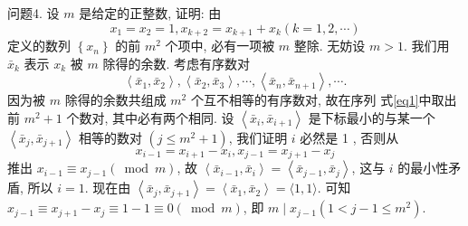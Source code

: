 问题4. 设 $m$ 是给定的正整数, 证明: 由
$$
x_1=x_2=1, x_{k+2}=x_{k+1}+x_k(k=1,2, \cdots)
$$
定义的数列 $\left\{x_n\right\}$ 的前 $m^2$ 个项中, 必有一项被 $m$ 整除.
无妨设 $m>1$. 我们用 $\bar{x}_k$ 表示 $x_k$ 被 $m$ 除得的余数.
考虑有序数对
$$
\left\langle\bar{x}_1, \bar{x}_2\right\rangle,\left\langle\bar{x}_2, \bar{x}_3\right\rangle, \cdots,\left\langle\bar{x}_n, \bar{x}_{n+1}\right\rangle, \cdots . \label{eq1}
$$
因为被 $m$ 除得的余数共组成 $m^2$ 个互不相等的有序数对, 故在序列 式\ref{eq1}中取出前 $m^2+1$ 个数对, 其中必有两个相同.
设 $\left\langle\bar{x}_i, \bar{x}_{i+1}\right\rangle$ 是下标最小的与某一个 $\left\langle\bar{x}_j, \bar{x}_{j+1}\right\rangle$ 相等的数对 $\left(j \leqslant m^2+1\right)$, 我们证明 $i$ 必然是 1 , 否则从
$$
x_{i-1}=x_{i+1}-x_i, x_{j-1}=x_{j+1}-x_j
$$
推出 $x_{i-1} \equiv x_{j-1}(\bmod m)$, 故 $\left\langle\bar{x}_{i-1}, \bar{x}_i\right\rangle=\left\langle\bar{x}_{j-1}, \bar{x}_j\right\rangle$, 这与 $i$ 的最小性矛盾, 所以 $i=1$. 现在由 $\left\langle\bar{x}_j, \bar{x}_{j+1}\right\rangle=\left\langle\bar{x}_1, \bar{x}_2\right\rangle=\langle 1,1\rangle$. 可知 $x_{j-1} \equiv x_{j+1}-x_j \equiv 1- 1 \equiv 0(\bmod m)$, 即 $m \mid x_{j-1}\left(1<j-1 \leqslant m^2\right)$.


